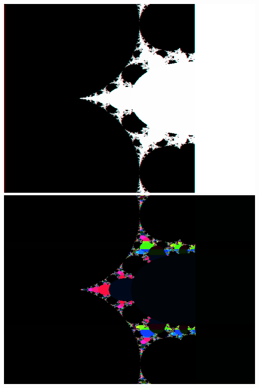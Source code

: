 \begin{Large}
\includegraphics[scale=1]{test1.16}
\newline
\includegraphics[scale=0.8]{test3.1}
\end{Large}